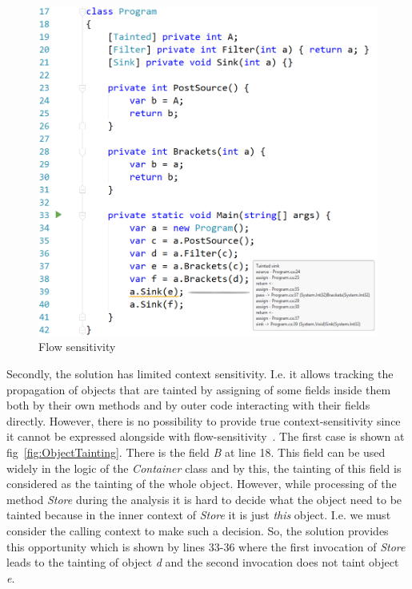 \begin{figure}[h]
	\includegraphics[width=\linewidth]{screenshots/ReturnsAndBrackets.png}
	\caption{Flow sensitivity}
	\label{fig:ReturnsAndBrackets}
\end{figure}

Secondly, the solution has limited context sensitivity. I.e. it allows tracking the propagation of objects that are tainted by assigning of some fields inside them both by their own methods and by outer code interacting with their fields directly.
However, there is no possibility to provide true context-sensitivity since it cannot be expressed alongside with flow-sensitivity~\cite{Spath:2019:CFF:3302515.3290361}.
The first case is shown at fig~\ref{fig:ObjectTainting}.
There is the field \textit{B} at line 18.
This field can be used widely in the logic of the \textit{Container} class and by this, the tainting of this field is considered as the tainting of the whole object.
However, while processing of the method \textit{Store} during the analysis it is hard to decide what the object need to be tainted because in the inner context of \textit{Store} it is just \textit{this} object.
I.e. we must consider the calling context to make such a decision.
So, the solution provides this opportunity which is shown by lines 33-36 where the first invocation of \textit{Store} leads to the tainting of object \textit{d} and the second invocation does not taint object \textit{e}.

